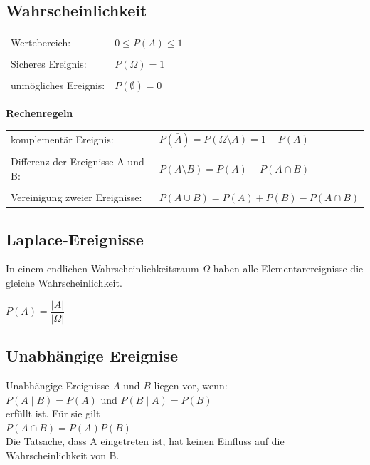 \vspace{5mm}
	\begin{minipage}{6.8cm}
	\subsection{Wahrscheinlichkeit}
		\begin{tabular}{ll}
			Wertebereich:
			& ${0}\le{P(A)}\le{1}$\\ \\
			Sicheres Ereignis:
			& $P(\Omega)=1$\\ \\
			unmögliches Ereignis:
			& $P(\emptyset)=0$
		\end{tabular}
	\end{minipage}
		\begin{minipage}{11.2cm}
		\textbf{Rechenregeln}\\
			\begin{tabular}{ll}
				komplementär Ereignis:
				&$P(\bar{A})=P({\Omega}\setminus{A})=1-P(A)$\\ \\
				Differenz der Ereignisse A und B:
				&$P({A}\setminus{B})=P(A)-P({A}\cap{B})$\\ \\
				Vereinigung zweier Ereignisse:
				&$P({A}\cup{B})=P(A)+P(B)-P({A}\cap{B})$
			\end{tabular}
		\end{minipage}
\vspace{1mm}

	
	\subsection{Laplace-Ereignisse  }
    	In einem endlichen Wahrscheinlichkeitsraum $\Omega$ haben alle
    	Elementarereignisse die gleiche Wahrscheinlichkeit.
    	\begin{center}
    	$P(A)=\dfrac{\left| A\right|}{\left|\Omega\right|}$
    	\end{center}

	\subsection{Unabhängige Ereignise  }
		Unabhängige Ereignisse $A$ und $B$ liegen vor, wenn:\\
    	\hspace*{8mm} $P(A\mid B)=P(A)$ \hspace{4mm} und \hspace{4mm}
    	$P(B\mid A)=P(B)$\\
    	erfüllt ist. Für sie gilt\\
    	\hspace*{8mm} $P(A\cap B)=P(A)P(B)$\\
    	Die Tatsache, dass A eingetreten ist, hat keinen Einfluss auf die 
		Wahrscheinlichkeit von B.\vspace{1mm}



